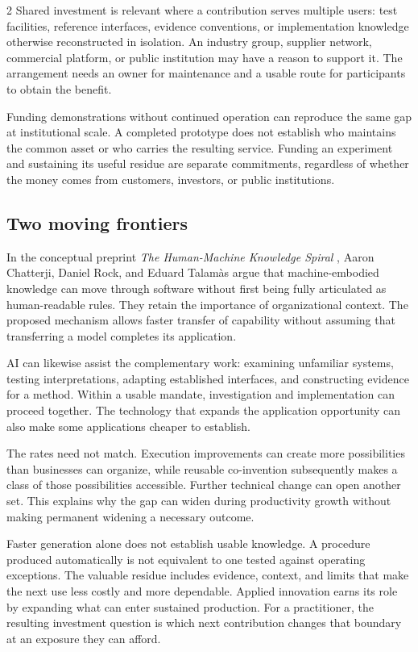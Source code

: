 \begin{multicols}{2}
Shared investment is relevant where a contribution serves multiple
users: test facilities, reference interfaces, evidence conventions, or
implementation knowledge otherwise reconstructed in isolation. An
industry group, supplier network, commercial platform, or public
institution may have a reason to support it. The arrangement needs an
owner for maintenance and a usable route for participants to obtain the
benefit.

Funding demonstrations without continued operation can reproduce the
same gap at institutional scale. A completed prototype does not
establish who maintains the common asset or who carries the resulting
service. Funding an experiment and sustaining its useful residue are
separate commitments, regardless of whether the money comes from
customers, investors, or public institutions.

\subsection{Two moving frontiers}\label{two-moving-frontiers}

In the conceptual preprint \emph{The Human-Machine Knowledge Spiral}
\citep{chatterji2026spiral}, Aaron Chatterji, Daniel Rock, and Eduard
Talamàs argue that machine-embodied knowledge can move through software
without first being fully articulated as human-readable rules. They
retain the importance of organizational context. The proposed mechanism
allows faster transfer of capability without assuming that transferring
a model completes its application.

AI can likewise assist the complementary work: examining unfamiliar
systems, testing interpretations, adapting established interfaces, and
constructing evidence for a method. Within a usable mandate,
investigation and implementation can proceed together. The technology
that expands the application opportunity can also make some applications
cheaper to establish.

The rates need not match. Execution improvements can create more
possibilities than businesses can organize, while reusable co-invention
subsequently makes a class of those possibilities accessible. Further
technical change can open another set. This explains why the gap can
widen during productivity growth without making permanent widening a
necessary outcome.

Faster generation alone does not establish usable knowledge. A procedure
produced automatically is not equivalent to one tested against operating
exceptions. The valuable residue includes evidence, context, and limits
that make the next use less costly and more dependable. Applied
innovation earns its role by expanding what can enter sustained
production. For a practitioner, the resulting investment question is
which next contribution changes that boundary at an exposure they can
afford.

\end{multicols}

